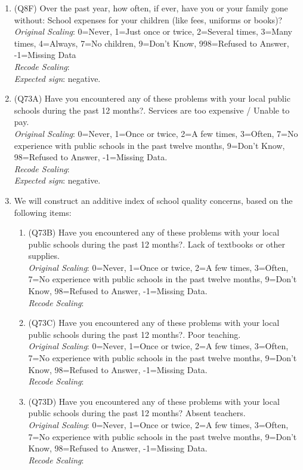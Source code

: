 \documentclass[]{article}
\begin{document}
\begin{enumerate}
  \item (Q8F) Over the past year, how often, if ever, have you or your family gone without: School expenses for your children (like fees, uniforms or books)?\\ \textit{Original Scaling}: 0=Never, 1=Just once or twice, 2=Several times, 3=Many times, 4=Always, 7=No children, 9=Don’t Know, 998=Refused to Answer, -1=Missing Data\\ \textit{Recode Scaling}:  \\ \textit{Expected sign}: negative.
  \item (Q73A) Have you encountered any of these problems with your local public schools during the past 12 months?. Services are too expensive / Unable to pay.\\ \textit{Original Scaling}: 0=Never, 1=Once or twice, 2=A few times, 3=Often, 7=No experience with public schools in the past twelve months, 9=Don’t Know, 98=Refused to Answer, -1=Missing Data. \\ \textit{Recode Scaling}:  \\ \textit{Expected sign}: negative.
  \item We will construct an additive index of school quality concerns, based on the following items:
  \begin{enumerate}
    \item (Q73B) Have you encountered any of these problems with your local public schools during the past 12 months?. Lack of textbooks or other supplies.\\ \textit{Original Scaling}: 0=Never, 1=Once or twice, 2=A few times, 3=Often, 7=No experience with public schools in the past twelve months, 9=Don’t Know, 98=Refused to Answer, -1=Missing Data. \\ \textit{Recode Scaling}:   
    \item (Q73C) Have you encountered any of these problems with your local public schools during the past 12 months?. Poor teaching.\\ \textit{Original Scaling}: 0=Never, 1=Once or twice, 2=A few times, 3=Often, 7=No experience with public schools in the past twelve months, 9=Don’t Know, 98=Refused to Answer, -1=Missing Data. \\ \textit{Recode Scaling}:  
    \item (Q73D) Have you encountered any of these problems with your local public schools during the past 12 months? Absent teachers.\\ \textit{Original Scaling}: 0=Never, 1=Once or twice, 2=A few times, 3=Often, 7=No experience with public schools in the past twelve months, 9=Don’t Know, 98=Refused to Answer, -1=Missing Data. \\ \textit{Recode Scaling}:  

\end{enumerate}
\end{enumerate}
\end{document}
